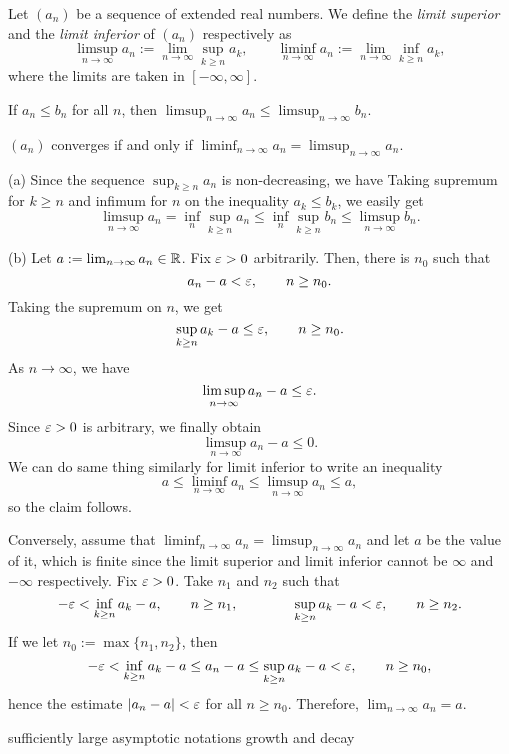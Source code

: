 \documentclass{../../large}
\begin{document}
\begin{prb}
Let $(a_n)$ be a sequence of extended real numbers.
We define the \emph{limit superior} and the \emph{limit inferior} of $(a_n)$ respectively as
\[\limsup_{n\to\infty}a_n:=\lim_{n\to\infty}\sup_{k\ge n}a_k,\qquad\liminf_{n\to\infty}a_n:=\lim_{n\to\infty}\inf_{k\ge n}a_k,\]
where the limits are taken in $[-\infty,\infty]$.
\begin{parts}
\item If $a_n\le b_n$ for all $n$, then $\limsup_{n\to\infty}a_n\le\limsup_{n\to\infty}b_n$.
\item $(a_n)$ converges if and only if $\liminf_{n\to\infty}a_n=\limsup_{n\to\infty}a_n$.
\end{parts}
\end{prb}
\begin{pf}
(a)
Since the sequence $\sup_{k\ge n}a_n$ is non-decreasing, we have
Taking supremum for $k\ge n$ and infimum for $n$ on the inequality $a_k\le b_k$, we easily get
\[\limsup_{n\to\infty}a_n=\inf_n\sup_{k\ge n}a_n\le\inf_n\sup_{k\ge n}b_n\le\limsup_{n\to\infty}b_n.\]

(b)
Let $a:=\lim_{n\to\infty}a_n\in\mathbb{R}$.
Fix $\varepsilon>0$ arbitrarily.
Then, there is $n_0$ such that
\[a_n-a<\varepsilon,\qquad n\ge n_0.\]
Taking the supremum on $n$, we get
\[\sup_{k\ge n}a_k-a\le\varepsilon,\qquad n\ge n_0.\]
As $n\to\infty$, we have
\[\limsup_{n\to\infty}a_n-a\le\varepsilon.\]
Since $\varepsilon>0$ is arbitrary, we finally obtain
\[\limsup_{n\to\infty}a_n-a\le0.\]
We can do same thing similarly for limit inferior to write an inequality
\[a\le\liminf_{n\to\infty}a_n\le\limsup_{n\to\infty}a_n\le a,\]
so the claim follows.

Conversely, assume that $\liminf_{n\to\infty}a_n=\limsup_{n\to\infty}a_n$ and let $a$ be the value of it, which is finite since the limit superior and limit inferior cannot be $\infty$ and $-\infty$ respectively.
Fix $\varepsilon>0$.
Take $n_1$ and $n_2$ such that 
\[-\varepsilon<\inf_{k\ge n}a_k-a,\qquad n\ge n_1,\qquad\qquad\sup_{k\ge n}a_k-a<\varepsilon,\qquad n\ge n_2.\]
If we let $n_0:=\max\{n_1,n_2\}$, then
\[-\varepsilon<\inf_{k\ge n}a_k-a\le a_n-a\le\sup_{k\ge n}a_k-a<\varepsilon,\qquad n\ge n_0,\]
hence the estimate $|a_n-a|<\varepsilon$ for all $n\ge n_0$.
Therefore, $\lim_{n\to\infty}a_n=a$.
\end{pf}

\begin{prb}[Asymptotics]
sufficiently large
asymptotic notations
growth and decay
\end{prb}
\end{document}
